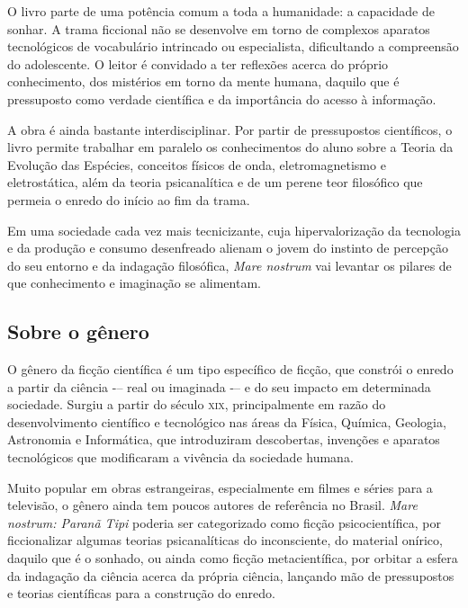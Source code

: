 \documentclass[12pt]{extarticle}
\begin{document}
O livro parte de uma potência comum a toda a humanidade: a capacidade de
sonhar. A trama ficcional não se desenvolve em torno de complexos aparatos
tecnológicos de vocabulário intrincado ou especialista, dificultando a
compreensão do adolescente. O leitor é convidado a ter reflexões acerca do próprio
conhecimento, dos mistérios em torno da mente humana, daquilo que é pressuposto
como verdade científica e da importância do acesso à informação.

A obra é ainda bastante interdisciplinar. Por partir de pressupostos
científicos, o livro permite trabalhar em paralelo os conhecimentos do aluno
sobre a Teoria da Evolução das Espécies, conceitos físicos de onda, eletromagnetismo 
e eletrostática, além da teoria psicanalítica e de um perene teor
filosófico que permeia o enredo do início ao fim da trama.

Em uma sociedade cada vez mais tecnicizante, cuja hipervalorização da
tecnologia e da produção e consumo desenfreado alienam o jovem do instinto de
percepção do seu entorno e da indagação filosófica, 
\emph{Mare nostrum} vai levantar os pilares de que conhecimento e imaginação se alimentam.

\subsection{Sobre o gênero}
O gênero da ficção científica é um tipo específico de ficção, que constrói o
enredo a partir da ciência -– real ou imaginada -– e do seu impacto em
determinada sociedade. Surgiu a partir do século \textsc{xix}, principalmente em razão
do desenvolvimento científico e tecnológico nas áreas da Física, Química,
Geologia, Astronomia e Informática, que introduziram descobertas, invenções e
aparatos tecnológicos que modificaram a vivência da sociedade humana.

Muito popular em obras estrangeiras, especialmente em filmes e séries para a
televisão, o gênero ainda tem poucos autores de referência no Brasil.
\textit{Mare nostrum: Paranã Tipi} poderia ser categorizado como ficção
psicocientífica, por ficcionalizar algumas teorias psicanalíticas do
inconsciente, do material onírico, daquilo que é o sonhado, ou ainda como
ficção metacientífica, por orbitar a esfera da indagação da ciência acerca da
própria ciência, lançando mão de pressupostos e teorias científicas para a
construção do enredo.


\end{document}
